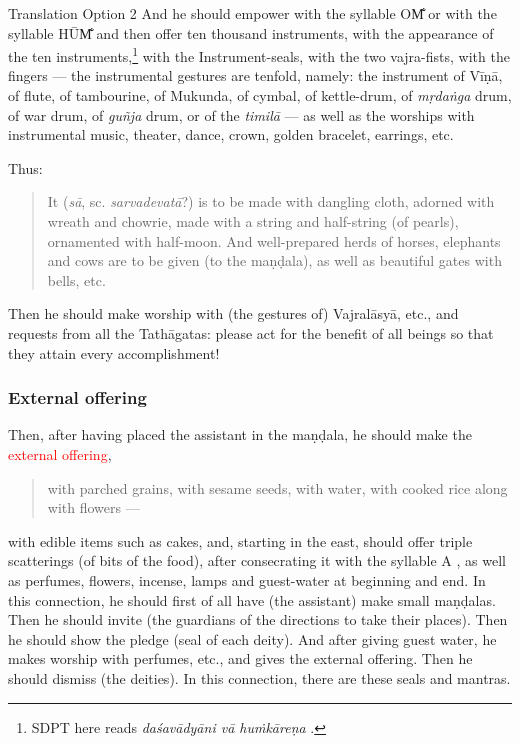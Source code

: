 \documentclass[11pt]{book}
\makeatletter
\def\fakesc#1{%
  \begingroup%
  \xdef\fake@name{\csname\curr@fontshape/\f@size\endcsname}%
  \fontsize{1.3\fontdimen8\fake@name}{\baselineskip}\selectfont%
  \uppercase{#1}%
  \endgroup%
}
\newcommand{\mantra}[1]{\fakesc{#1}}
\newcommand{\red}[1]{\textcolor{red}{#1}}
\newcommand{\skt}[1]{\emph{#1}}
\makeatother
\begin{document}
Translation Option 2
	And he should empower with the syllable \mantra{om̐} or with the syllable \mantra{hūm̐} and then offer ten thousand instruments, with the appearance of the ten instruments,\footnote{SDPT here reads \skt{daśavādyāni vā huṁkāreṇa }.} with the Instrument-seals, with the two vajra-fists, with the fingers — the instrumental gestures are tenfold, namely: the instrument of Vīṇā, of flute, of tambourine,  of Mukunda, of cymbal, of kettle-drum, of \skt{mṛdaṅga} drum, of war drum, of \skt{guñja} drum, or of the \skt{timilā} — as well as the worships with instrumental music, theater, dance, crown, golden bracelet, earrings, etc.

Thus:

\begin{verse}
It (\skt{sā}, sc. \skt{sarvadevatā}?) is to be made with dangling cloth, adorned with wreath and chowrie, made with a string and half-string (of pearls), ornamented with half-moon. And well-prepared herds of horses, elephants and cows are to be given (to the maṇḍala), as well as beautiful gates with bells, etc.
\end{verse}

Then he should make worship with (the gestures of) Vajralāsyā, etc., and requests from all the Tathāgatas: please act for the benefit of all beings so that they attain every accomplishment!

\subsubsection{External offering}

Then, after having placed the assistant in the maṇḍala, he should make the \red{external offering}, %

\begin{verse}
with parched grains, with sesame seeds, with water, with cooked rice along with flowers —
\end{verse}

with edible items such as cakes, and, starting in the east, should offer triple scatterings (of bits of the food), after consecrating it with the syllable \mantra{a}, as well as perfumes, flowers, incense, lamps and guest-water at beginning and end. In this connection, he should first of all have (the assistant) make small maṇḍalas. Then he should invite (the guardians of the directions to take their places). Then he should show the pledge (seal of each deity). And after giving guest water, he makes worship with perfumes, etc., and gives the external offering. Then he should dismiss (the deities). In this connection, there are these seals and mantras.
\end{document}
